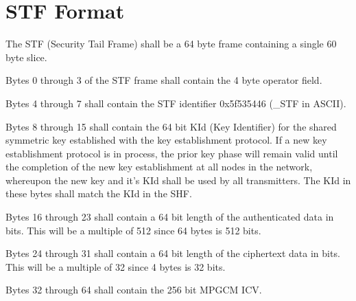 \documentclass[../../../OAE-SPEC-MAIN.tex]{subfiles}
\begin{document}
\section{STF Format}
The STF (Security Tail Frame) shall be a 64 byte frame containing a single 60 byte slice.

Bytes 0 through 3 of the STF frame shall contain the 4 byte operator field.

Bytes 4 through 7 shall contain the STF identifier 0x5f535446 (_STF in ASCII).

Bytes 8 through 15 shall contain the 64 bit KId (Key Identifier) for the shared symmetric key established with the key establishment protocol. If a new key establishment protocol is in process, the prior key phase will remain valid until the completion of the new key establishment at all nodes in the network, whereupon the new key and it's KId shall be used by all transmitters. The KId in these bytes shall match the KId in the SHF.

Bytes 16 through 23 shall contain a 64 bit length of the authenticated data in bits. This will be a multiple of 512 since 64 bytes is 512 bits.

Bytes 24 through 31 shall contain a 64 bit length of the ciphertext data in bits. This will be a multiple of 32 since 4 bytes is 32 bits.

Bytes 32 through 64 shall contain the 256 bit MPGCM ICV.
\end{document}
